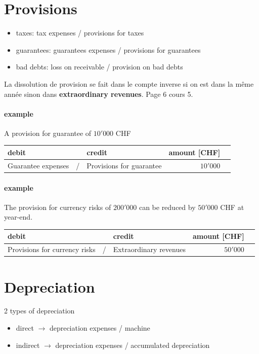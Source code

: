 \documentclass[a4paper] {scrartcl}
\begin{document}
\section{Provisions}
\begin{itemize}
	\item taxes: tax expenses / provisions for taxes
	\item guarantees: guarantees expenses / provisions for guarantees
	\item bad debts: loss on receivable / provision on bad debts
\end{itemize}

La dissolution de provision se fait dans le compte inverse si on est dans la même année sinon dans \textbf{extraordinary revenues}. Page 6 cours 5.

\paragraph{example} A provision for guarantee of $10'000$ CHF \\

\begin{tabular}{lllrl}
	\textbf{debit} & & \textbf{credit} & \textbf{amount} [CHF]&\\
	\hline
	 Guarantee expenses & / &  Provisions for guarantee & $10'000$\\
\end{tabular}

\paragraph{example} The provision for currency risks of $200'000$ can be reduced by $50'000$ CHF at year-end.\\

\begin{tabular}{lllrl}
	\textbf{debit} & & \textbf{credit} & \textbf{amount} [CHF]&\\
	\hline
	 Provisions for currency risks & / &  Extraordinary revenues & $50'000$\\
\end{tabular}

\section{Depreciation}
2 types of depreciation
\begin{itemize}
	\item direct $\rightarrow$ depreciation expenses / machine
	\item indirect $\rightarrow$ depreciation expenses / accumulated depreciation
\end{itemize}
\end{document}

